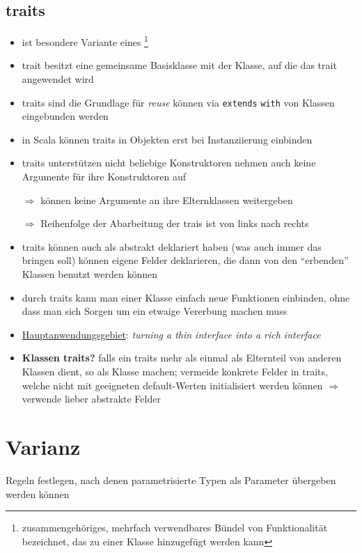 \subsection{traits}
\begin{itemize}
  \item ist besondere Variante eines \footnote{zusammengehöriges, 
  mehrfach verwendbares Bündel von Funktionalität bezeichnet, das zu einer Klasse 
  hinzugefügt werden kann}
  \item trait besitzt eine gemeinsame Basisklasse mit der Klasse, 
  auf die das trait angewendet wird
  \item traits sind die Grundlage für \textit{reuse} \und können via
  \texttt{extends} \oder \texttt{with} von Klassen eingebunden werden
  \item in Scala können traits in Objekten erst bei Instanziierung
  einbinden
  \item traits unterstützen nicht beliebige Konstruktoren \und nehmen auch
  keine Argumente für ihre Konstruktoren auf
  
  $\Rightarrow$ können keine Argumente an ihre Elternklassen weitergeben
  
  
  
  $\Rightarrow$ Reihenfolge der Abarbeitung der trais ist von links nach
  rechts

  \item traits können auch als abstrakt deklariert haben (was auch immer
  das bringen soll) \und können eigene Felder deklarieren, die dann
  von den \enquote{erbenden} Klassen benutzt werden können
  \item durch traits kann man einer Klasse einfach neue Funktionen
  einbinden, ohne dass man sich Sorgen um ein etwaige Vererbung machen
  muss
  \item \uline{Hauptanwendungsgebiet}: \textit{turning a thin interface
  into a rich interface}
  \item \textbf{Klassen \oder traits?} falls ein traits mehr als einmal 
  als Elternteil von anderen Klassen dient, so als Klasse machen; vermeide
  konkrete Felder in traits, welche nicht mit geeigneten default-Werten
  initialisiert werden können $\Rightarrow$ verwende lieber abstrakte
  Felder
\end{itemize}
\pagebreak


\section{Varianz}
Regeln festlegen, nach denen parametrisierte Typen als Parameter übergeben
werden können


